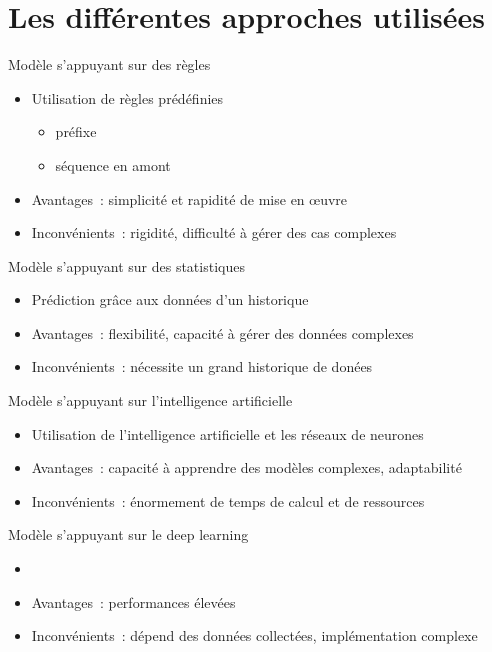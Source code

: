 \section{Les différentes approches utilisées}
\begin{frame}{Modèle s'appuyant sur des règles}
	\begin{itemize}
		\item Utilisation de règles prédéfinies
		      \begin{itemize}
			      \item préfixe
			      \item séquence en amont
		      \end{itemize}
		\item Avantages~: simplicité et rapidité de mise en œuvre
		\item Inconvénients~: rigidité, difficulté à gérer des cas complexes
	\end{itemize}
\end{frame}

\begin{frame}{Modèle s'appuyant sur des statistiques}
	\begin{itemize}
		\item Prédiction grâce aux données d'un historique
		\item Avantages~: flexibilité, capacité à gérer des données complexes
		\item Inconvénients~: nécessite un grand historique de donées
	\end{itemize}
\end{frame}


\begin{frame}{Modèle s'appuyant sur l'intelligence artificielle}
	\begin{itemize}
		\item Utilisation de l'intelligence artificielle et les réseaux de neurones
		\item Avantages~: capacité à apprendre des modèles complexes, adaptabilité
		\item Inconvénients~: énormement de temps de calcul et de ressources
	\end{itemize}
\end{frame}


\begin{frame}{Modèle s'appuyant sur le deep learning}
	\begin{itemize}
		\item
		\item Avantages~: performances élevées
		\item Inconvénients~: dépend des données collectées, implémentation complexe
	\end{itemize}
\end{frame}
